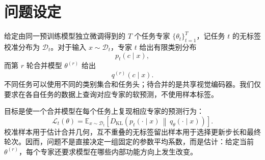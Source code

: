 \section{问题设定}
\label{sec:ink-problem}

给定由同一预训练模型独立微调得到的 $T$ 个任务专家 $\{\theta_t\}_{t=1}^T$，记任务 $t$ 的无标签校准分布为 $\mathcal D_t$。对于输入 $x\sim\mathcal D_t$，专家 $t$ 给出有限类别分布
\begin{equation}
  p_t(c\mid x),
\end{equation}
而第 $r$ 轮合并模型 $\theta^{(r)}$ 给出
\begin{equation}
  q^{(r)}(c\mid x).
\end{equation}
不同任务可以使用不同的类别集合和任务头；待合并的是共享视觉编码器。我们仅要求在各自任务的数据上查询对应专家的软预测，不使用样本标签。

目标是使一个合并模型在每个任务上复现相应专家的预测行为：
\begin{equation}
  \mathcal L_t(\theta)
  =
  \mathbb E_{x\sim\mathcal D_t}
  \left[
    D_{\mathrm{KL}}
    \left(
      p_t(\cdot\mid x)
      \,\middle\|\,
      q_\theta(\cdot\mid x)
    \right)
  \right].
  \label{eq:ink-teacher-objective}
\end{equation}
校准样本用于估计合并几何，互不重叠的无标签留出样本用于选择更新步长和最终轮次。因而，问题不是直接决定一组固定的参数平均系数，而是估计：给定当前 $\theta^{(r)}$，每个专家还要求模型在哪些内部功能方向上发生改变。
